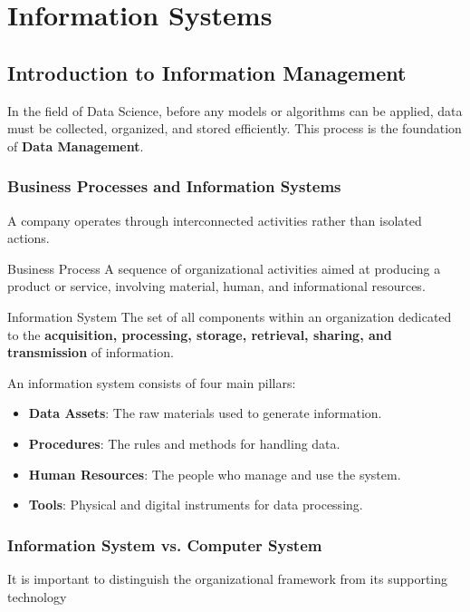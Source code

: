 
\section{Information Systems}

\subsection{Introduction to Information Management}
In the field of Data Science, before any models or algorithms can be applied, data must be collected, organized, and stored efficiently. This process is the foundation of \textbf{Data Management}.

\vspace{-0.25cm}

\subsubsection{Business Processes and Information Systems}
A company operates through interconnected activities rather than isolated actions.

\begin{defbox}{Business Process}
A sequence of organizational activities aimed at producing a product or service, involving material, human, and informational resources.
\end{defbox}

\begin{defbox}{Information System}
The set of all components within an organization dedicated to the \textbf{acquisition, processing, storage, retrieval, sharing, and transmission} of information.
\end{defbox}

An information system consists of four main pillars:
\begin{itemize}
    \item \textbf{Data Assets}: The raw materials used to generate information.
    \item \textbf{Procedures}: The rules and methods for handling data.
    \item \textbf{Human Resources}: The people who manage and use the system.
    \item \textbf{Tools}: Physical and digital instruments for data processing.
\end{itemize}

\vspace{-0.2cm}
\subsubsection{Information System vs. Computer System}
It is important to distinguish the organizational framework from its supporting technology

